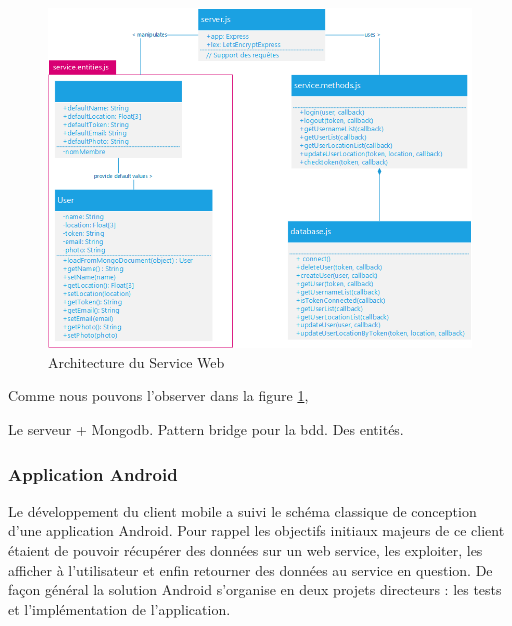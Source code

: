             \begin{figure}[H]
                \centering
                \includegraphics[width=\textwidth]{./img/architecture-service-web.png}
                \caption{Architecture du Service Web}
                \label{asweb}
            \end{figure}

            Comme nous pouvons l'observer dans la figure \ref{asweb}, 



            Le serveur + Mongodb.
            Pattern bridge pour la bdd. Des entités.

        \subsubsection{Application Android}

            Le développement du client mobile a suivi le schéma classique de conception d’une application Android. Pour rappel les objectifs initiaux majeurs de ce client étaient de pouvoir récupérer des données sur un web service, les exploiter, les afficher à l’utilisateur et enfin retourner des données au service en question. De façon général la solution Android s’organise en deux projets directeurs : les tests et l’implémentation de l’application. 

